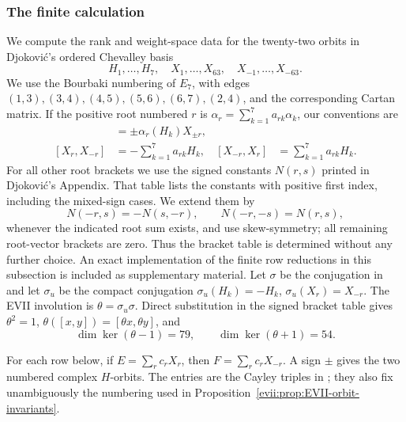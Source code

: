 \documentclass[11pt,reqno]{amsart}
\numberwithin{equation}{section}
\theoremstyle{definition}
\theoremstyle{remark}
\begin{document}
\subsubsection{The finite calculation}

We compute the rank and weight-space data for the twenty-two orbits in
Djokovi\'c's ordered
Chevalley basis
\[
 H_1,\ldots,H_7,\quad X_1,\ldots,X_{63},\quad
 X_{-1},\ldots,X_{-63}.
\]
We use the Bourbaki numbering of $E_7$, with edges
$(1,3),(3,4),(4,5),(5,6),(6,7),(2,4)$, and the corresponding Cartan matrix.
If the positive root numbered $r$ is
$\alpha_r=\sum_{k=1}^7a_{rk}\alpha_k$, our conventions are
\begin{align*}
 [H_k,X_{\pm r}]&=\pm\alpha_r(H_k)X_{\pm r},\\
 [X_r,X_{-r}]&=-\sum_{k=1}^7a_{rk}H_k,
 & [X_{-r},X_r]&=\sum_{k=1}^7a_{rk}H_k.
\end{align*}
For all other root brackets we use the signed constants $N(r,s)$ printed in
Djokovi\'c's Appendix.  That table lists the constants with positive first
index, including the mixed-sign cases.  We extend them by
\[
 N(-r,s)=-N(s,-r),\qquad N(-r,-s)=N(r,s),
\]
whenever the indicated root sum exists, and use skew-symmetry; all remaining
root-vector brackets are zero.  Thus the bracket table is determined without
any further choice.  An exact implementation of the finite row reductions in
this subsection is included as supplementary material.  Let $\sigma$ be the
conjugation in
\cite[Table~3]{Djokovic} and let $\sigma_u$ be the compact conjugation
$\sigma_u(H_k)=-H_k$, $\sigma_u(X_r)=X_{-r}$.  The EVII involution is
$\theta=\sigma_u\sigma$.  Direct substitution in the signed bracket table
gives $\theta^2=1$, $\theta([x,y])=[\theta x,\theta y]$, and
\[
 \dim\ker(\theta-1)=79,\qquad \dim\ker(\theta+1)=54.
\]

For each row below, if $E=\sum_rc_rX_r$, then
$F=\sum_rc_rX_{-r}$.  A sign $\pm$ gives the two numbered complex
$H$-orbits.  The entries are the Cayley triples in
\cite[Table~6]{Djokovic}; they also fix unambiguously the numbering used in
Proposition~\ref{evii:prop:EVII-orbit-invariants}.
\end{document}

